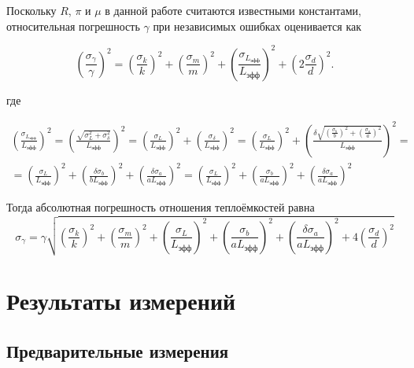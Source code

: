 \documentclass[12pt]{extreport}
\begin{document}
	Поскольку \(R\), \(\pi\) и \(\mu\) в данной работе считаются известными константами, относительная погрешность \(\gamma\) при независимых ошибках оценивается как
	
	\begin{equation}
		\left(\frac{\sigma_\gamma}{\gamma}\right)^2
		=
		\left(\frac{\sigma_k}{k}\right)^2+
		\left(\frac{\sigma_m}{m}\right)^2+
		\left(\frac{\sigma_{L_{\text{эфф}}}}{L_{\text{эфф}}}\right)^2+
		\left(2\frac{\sigma_d}{d}\right)^2.
		\label{eq:sigma_gamma_d}
	\end{equation}
	
	
	
	где
	
	\begin{multline}
				\left(\frac{\sigma_{L_{\text{эфф}}}}{L_{\text{эфф}}}\right)^2 = \left(\frac{\sqrt{\sigma_{L}^2+\sigma_\delta^2}}{L_{\text{эфф}}}\right)^2 = \left(\frac{\sigma_{L}}{L_{\text{эфф}}}\right)^2 + \left(\frac{\sigma_\delta}{L_{\text{эфф}}}\right)^2 =
				\left(\frac{\sigma_{L}}{L_{\text{эфф}}}\right)^2 + \left(\frac{\delta\sqrt{
						\left(\frac{\sigma_b}{b}\right)^2+
						\left(\frac{\sigma_a}{a}\right)^2}}{L_{\text{эфф}}}\right)^2 = \\ =	\left(\frac{\sigma_{L}}{L_{\text{эфф}}}\right)^2 + \left(\frac{\delta
						\sigma_b}{bL_{\text{эфф}}}\right)^2	+ \left(\frac{\delta
						\sigma_a}{aL_{\text{эфф}}}\right)^2	= \left(\frac{\sigma_{L}}{L_{\text{эфф}}}\right)^2 + \left(\frac{
						\sigma_b}{aL_{\text{эфф}}}\right)^2	+ \left(\frac{\delta
						\sigma_a}{aL_{\text{эфф}}}\right)^2
	\end{multline}
	
	Тогда абсолютная погрешность отношения теплоёмкостей равна
	\begin{equation}
	\boxed{\sigma_\gamma
		=
		\gamma
		\sqrt{
			\left(\frac{\sigma_k}{k}\right)^2+
			\left(\frac{\sigma_m}{m}\right)^2+
			 \left(\frac{\sigma_{L}}{L_{\text{эфф}}}\right)^2 + \left(\frac{
				\sigma_b}{aL_{\text{эфф}}}\right)^2	+ \left(\frac{\delta
				\sigma_a}{aL_{\text{эфф}}}\right)^2+
			4\left(\frac{\sigma_d}{d}\right)^2
	}}
	\label{eq:abs_sigma_gamma}
	\end{equation}
	
	\chapter{Результаты измерений}
	
	\section{Предварительные измерения}
	
\end{document}
